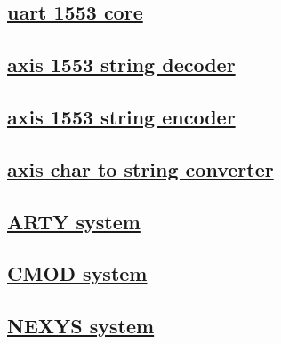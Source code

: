 \documentclass{article}
\begin{document}
  


  \subsection{\href{../files/uart_1553_core-v.html}{uart 1553 core}}
  \subsection{\href{../files/axis_1553_string_decoder-v.html}{axis 1553 string decoder}}
  \subsection{\href{../files/axis_1553_string_encoder-v.html}{axis 1553 string encoder}}
  \subsection{\href{../files/axis_char_to_string_converter-v.html}{axis char to string converter}}
  \subsection{\href{../files2/system_wrapper-v.html}{ARTY system}}
  \subsection{\href{../files3/system_wrapper-v.html}{CMOD system}}
  \subsection{\href{../files4/system_wrapper-v.html}{NEXYS system}}
\end{document}
